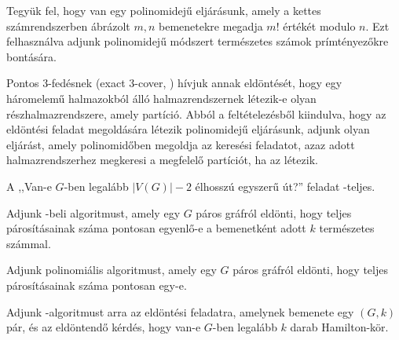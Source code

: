 
\begin{Exercise}[counter={sorszam}, difficulty=0]
 Tegyük fel, hogy van egy polinomidejű eljárásunk, amely a kettes számrendszerben ábrázolt $m,n$ bemenetekre megadja $m!$ értékét modulo $n$. Ezt felhasználva adjunk polinomidejű módszert természetes számok prímtényezőkre bontására.
\end{Exercise}


\begin{Exercise}[counter={sorszam}, difficulty=0]
\easy {} Pontos 3-fedésnek (exact 3-cover, ) hívjuk annak eldöntését, hogy egy háromelemű halmazokból álló halmazrendszernek létezik-e olyan részhalmazrendszere, amely partíció. Abból a feltételezésből kiindulva, hogy az  eldöntési feladat megoldására létezik polinomidejű eljárásunk, adjunk olyan eljárást, amely polinomidőben megoldja az  keresési feladatot, azaz adott halmazrendszerhez megkeresi a megfelelő partíciót, ha az létezik.
\end{Exercise}


\begin{Exercise}[counter={sorszam}, difficulty=0]
 A ,,Van-e $G$-ben legalább $|V(G)|-2$ élhosszú egyszerű út?'' feladat \NP-teljes.
\end{Exercise}


\begin{Exercise}[counter={sorszam}, difficulty=0]
 Adjunk \PSPACE-beli algoritmust, amely egy $G$ páros gráfról eldönti, hogy teljes párosításainak száma pontosan egyenlő-e a bemenetként adott $k$ természetes számmal.
\end{Exercise}


\begin{Exercise}[counter={sorszam}, difficulty=0]
 Adjunk polinomiális algoritmust, amely egy $G$ páros gráfról eldönti, hogy teljes párosításainak száma pontosan egy-e.
\end{Exercise}


\begin{Exercise}[counter={sorszam}, difficulty=0]
 Adjunk \PSPACE-algoritmust arra az eldöntési feladatra, amelynek bemenete egy $(G,k)$ pár, és az eldöntendő kérdés, hogy van-e $G$-ben legalább $k$ darab Hamilton-kör.
\end{Exercise}


